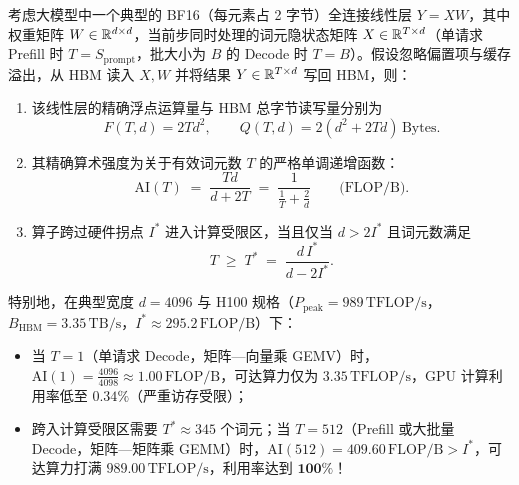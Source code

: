 \begin{thmBox}
\begin{theorem}
\label{thm:prefill-vs-decode}
考虑大模型中一个典型的 BF16（每元素占 2 字节）全连接线性层 $Y = X W$，其中权重矩阵 $W \in \mathbb{R}^{d \times d}$，当前步同时处理的词元隐状态矩阵 $X \in \mathbb{R}^{T \times d}$（单请求 Prefill 时 $T = S_{\mathrm{prompt}}$，批大小为 $B$ 的 Decode 时 $T = B$）。假设忽略偏置项与缓存溢出，从 HBM 读入 $X, W$ 并将结果 $Y \in \mathbb{R}^{T \times d}$ 写回 HBM，则：
\begin{enumerate}
  \item 该线性层的精确浮点运算量与 HBM 总字节读写量分别为
  \begin{equation}
    F(T, d) = 2 T d^2, \qquad
    Q(T, d) = 2\!\left(d^2 + 2 T d\right)\,\text{Bytes}.
    \label{eq:gemm-flops-bytes}
  \end{equation}
  \item 其精确算术强度为关于有效词元数 $T$ 的严格单调递增函数：
  \begin{equation}
    \mathrm{AI}(T) \;=\; \frac{T d}{d + 2 T} \;=\; \frac{1}{\frac{1}{T} + \frac{2}{d}} \qquad \big(\mathrm{FLOP/B}\big).
    \label{eq:gemm-ai}
  \end{equation}
  \item 算子跨过硬件拐点 $I^*$ 进入计算受限区，当且仅当 $d > 2 I^*$ 且词元数满足
  \begin{equation}
    T \;\ge\; T^* \;=\; \frac{d\, I^*}{d - 2 I^*}.
    \label{eq:critical-tokens}
  \end{equation}
\end{enumerate}
特别地，在典型宽度 $d = 4096$ 与 H100 规格（$P_{\mathrm{peak}} = 989\,\mathrm{TFLOP/s}$，$B_{\mathrm{HBM}} = 3.35\,\mathrm{TB/s}$，$I^* \approx 295.2\,\mathrm{FLOP/B}$）下：
\begin{itemize}
  \item 当 $T = 1$（单请求 Decode，矩阵—向量乘 GEMV）时，$\mathrm{AI}(1) = \frac{4096}{4098} \approx 1.00\,\mathrm{FLOP/B}$，可达算力仅为 $3.35\,\mathrm{TFLOP/s}$，GPU 计算利用率低至 $\mathbf{0.34\%}$（严重访存受限）；
  \item 跨入计算受限区需要 $T^* \approx 345$ 个词元；当 $T = 512$（Prefill 或大批量 Decode，矩阵—矩阵乘 GEMM）时，$\mathrm{AI}(512) = 409.60\,\mathrm{FLOP/B} > I^*$，可达算力打满 $\mathbf{989.00\,\mathrm{TFLOP/s}}$，利用率达到 $\mathbf{100\%}$！
\end{itemize}
\end{theorem}
\end{thmBox}

